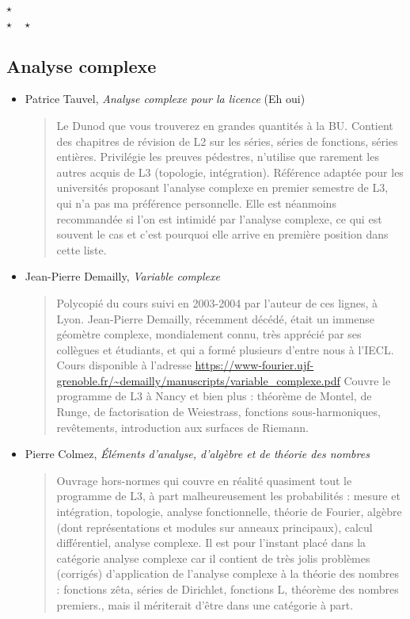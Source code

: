 \documentclass{article}
\def\separateur{\begin{center}
$\star$\\
$\star\quad\star$
\end{center}}
\begin{document}
\separateur
\subsection{Analyse complexe}

\begin{mdframed}
\begin{itemize}
\item Patrice Tauvel, \emph{Analyse complexe pour la licence} (Eh oui)
\begin{quote}
Le \og Dunod\fg{} que vous trouverez en grandes quantités à la BU. Contient des chapitres de révision de L2 sur les séries, séries de fonctions, séries entières. Privilégie les preuves pédestres, n'utilise que rarement les autres acquis de L3 (topologie, intégration).  Référence adaptée pour les universités proposant l'analyse complexe en premier semestre de L3, qui n'a pas ma préférence personnelle. Elle est néanmoins recommandée si l'on est intimidé par l'analyse complexe, ce qui est souvent le cas et c'est pourquoi elle arrive en première position dans cette liste.
\end{quote}
\end{itemize}
\end{mdframed}
\begin{itemize}
\item Jean-Pierre Demailly, \emph{Variable complexe}
\begin{quote}
Polycopié du cours suivi en 2003-2004 par l'auteur de ces lignes, à Lyon. Jean-Pierre Demailly, récemment décédé, était un immense géomètre complexe, mondialement connu, très apprécié par ses collègues et étudiants, et qui a formé plusieurs d'entre nous à l'IECL. Cours disponible à l'adresse \url{https://www-fourier.ujf-grenoble.fr/~demailly/manuscripts/variable_complexe.pdf} Couvre le programme de L3 à Nancy et bien plus : théorème de Montel, de Runge, de factorisation de Weiestrass, fonctions sous-harmoniques, revêtements, introduction aux surfaces de Riemann.
\end{quote}
\item Pierre Colmez, \emph{Éléments d'analyse, d'algèbre et de théorie des nombres}
\begin{quote}
Ouvrage hors-normes qui couvre en réalité quasiment tout le programme de L3, à part malheureusement les probabilités : mesure et intégration, topologie, analyse fonctionnelle, théorie de Fourier, algèbre (dont représentations et modules sur anneaux principaux), calcul différentiel, analyse complexe. Il est pour l'instant placé dans la catégorie analyse complexe car il contient de très jolis problèmes (corrigés) d'application de l'analyse complexe à la théorie des nombres : fonctions zêta, séries de Dirichlet, fonctions L, théorème des nombres premiers., mais il mériterait d'être dans une catégorie à part.
\end{quote}
\end{itemize}
\end{document}
